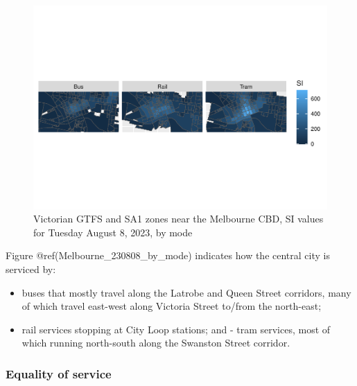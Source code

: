 \documentclass[preprint, 3p,
authoryear]{elsarticle} %
\providecommand{\tightlist}{%
  \setlength{\itemsep}{0pt}\setlength{\parskip}{0pt}}
\begin{document}
\begin{figure}
\centering
\includegraphics{Leveraging_GTFS_to_assess_transit_supply_Transport_Geography_files/figure-latex/Melbourne_230808_by_mode-1.pdf}
\caption{Victorian GTFS and SA1 zones near the Melbourne CBD, SI values
for Tuesday August 8, 2023, by mode}
\end{figure}

Figure @ref(Melbourne\_230808\_by\_mode) indicates how the central city
is serviced by:

\begin{itemize}
\tightlist
\item
  buses that mostly travel along the Latrobe and Queen Street corridors,
  many of which travel east-west along Victoria Street to/from the
  north-east;
\item
  rail services stopping at City Loop stations; and - tram services,
  most of which running north-south along the Swanston Street corridor.
\end{itemize}

\hypertarget{equality-of-service}{%
\subsubsection{Equality of service}\label{equality-of-service}}
\end{document}
